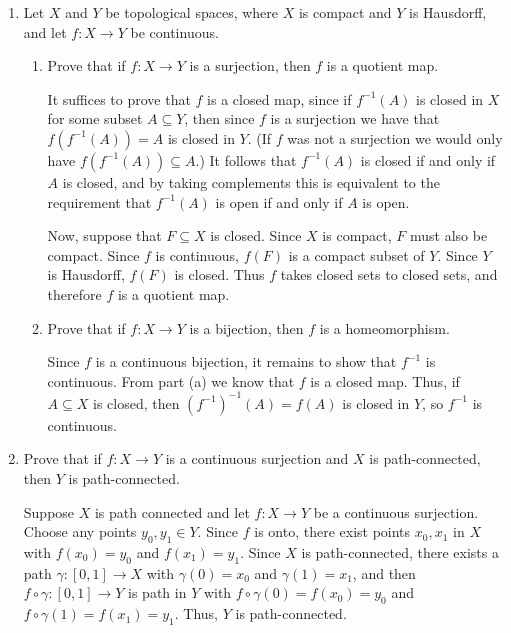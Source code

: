 \documentclass[12pt]{article}
\newcommand{\points}[1]{\marginpar{\hspace{24pt}[#1]}}
\begin{document}
\begin{enumerate}
\newpage

\item Let $X$ and $Y$ be topological spaces, where $X$ is compact and $Y$ is Hausdorff, and let $f:X\to Y$ be continuous.
\begin{enumerate}
 \item Prove that if $f:X\to Y$ is a surjection, then $f$ is a quotient map. \points{5}

\bigskip

It suffices to prove that $f$ is a closed map, since if $f^{-1}(A)$ is closed in $X$ for some subset $A\subseteq Y$, then since $f$ is a surjection we have that $f(f^{-1}(A))=A$ is closed in $Y$. (If $f$ was not a surjection we would only have $f(f^{-1}(A))\subseteq A$.) It follows that $f^{-1}(A)$ is closed if and only if $A$ is closed, and by taking complements this is equivalent to the requirement that $f^{-1}(A)$ is open if and only if $A$ is open.

Now, suppose that $F\subseteq X$ is closed. Since $X$ is compact, $F$ must also be compact. Since $f$ is continuous, $f(F)$ is a compact subset of $Y$. Since $Y$ is Hausdorff, $f(F)$ is closed. Thus $f$ takes closed sets to closed sets, and therefore $f$ is a quotient map.

\bigskip

 \item Prove that if $f:X\to Y$ is a bijection, then $f$ is a homeomorphism. \points{3}

\bigskip

Since $f$ is a continuous bijection, it remains to show that $f^{-1}$ is continuous. From part (a) we know that $f$ is a closed map. Thus, if $A\subseteq X$ is closed, then $(f^{-1})^{-1}(A) = f(A)$ is closed in $Y$, so $f^{-1}$ is continuous.

\end{enumerate}
\newpage
 \item Prove that if $f:X\to Y$ is a continuous surjection and $X$ is path-connected, then $Y$ is path-connected. \points{5}

\bigskip

Suppose $X$ is path connected and let $f:X\to Y$ be a continuous surjection. Choose any points $y_0,y_1\in Y$. Since $f$ is onto, there exist points $x_0,x_1$ in $X$ with $f(x_0)=y_0$ and $f(x_1)=y_1$. Since $X$ is path-connected, there exists a path $\gamma:[0,1]\to X$ with $\gamma(0)=x_0$ and $\gamma(1)=x_1$, and then $f\circ\gamma:[0,1]\to Y$ is path in $Y$ with $f\circ\gamma(0)=f(x_0)=y_0$ and $f\circ\gamma(1)=f(x_1)=y_1$. Thus, $Y$ is path-connected.


\end{enumerate}
\end{document}
